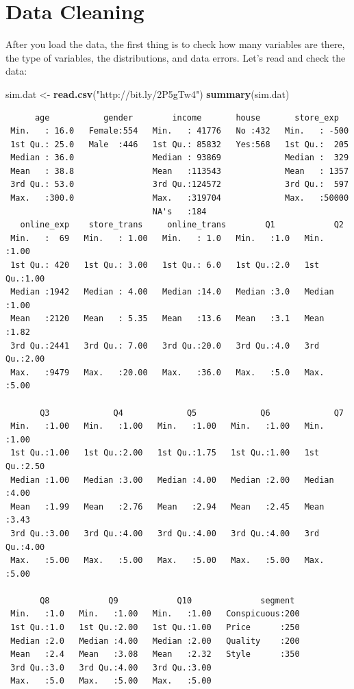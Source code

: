 \documentclass[12pt,]{krantz}
\makeatletter
\newenvironment{Shaded}{\begin{snugshade}}{\end{snugshade}}
\newcommand{\KeywordTok}[1]{\textcolor[rgb]{0.27,0.27,0.27}{\textbf{#1}}}
\newcommand{\NormalTok}[1]{#1}
\newcommand{\StringTok}[1]{\textcolor[rgb]{0.5,0.5,0.5}{#1}}
\newenvironment{kframe}{%
\medskip{}
\setlength{\fboxsep}{.8em}
 \def\at@end@of@kframe{}%
 \ifinner\ifhmode%
  \def\at@end@of@kframe{\end{minipage}}%
  \begin{minipage}{\columnwidth}%
 \fi\fi%
 \def\FrameCommand##1{\hskip\@totalleftmargin \hskip-\fboxsep
 \colorbox{shadecolor}{##1}\hskip-\fboxsep
     \hskip-\linewidth \hskip-\@totalleftmargin \hskip\columnwidth}%
 \MakeFramed {\advance\hsize-\width
   \@totalleftmargin\z@ \linewidth\hsize
   \@setminipage}}%
 {\par\unskip\endMakeFramed%
 \at@end@of@kframe}
\renewenvironment{Shaded}{\begin{kframe}}{\end{kframe}}
\makeatother
\begin{document}
\hypertarget{data-cleaning}{%
\section{Data Cleaning}\label{data-cleaning}}

After you load the data, the first thing is to check how many variables are there, the type of variables, the distributions, and data errors. Let's read and check the data:

\begin{Shaded}
\begin{Highlighting}[]
\NormalTok{sim.dat <-}\StringTok{ }\KeywordTok{read.csv}\NormalTok{(}\StringTok{"http://bit.ly/2P5gTw4"}\NormalTok{)}
\KeywordTok{summary}\NormalTok{(sim.dat)}
\end{Highlighting}
\end{Shaded}

\begin{verbatim}
      age           gender        income       house       store_exp    
 Min.   : 16.0   Female:554   Min.   : 41776   No :432   Min.   : -500  
 1st Qu.: 25.0   Male  :446   1st Qu.: 85832   Yes:568   1st Qu.:  205  
 Median : 36.0                Median : 93869             Median :  329  
 Mean   : 38.8                Mean   :113543             Mean   : 1357  
 3rd Qu.: 53.0                3rd Qu.:124572             3rd Qu.:  597  
 Max.   :300.0                Max.   :319704             Max.   :50000  
                              NA's   :184                               
   online_exp    store_trans     online_trans        Q1            Q2      
 Min.   :  69   Min.   : 1.00   Min.   : 1.0   Min.   :1.0   Min.   :1.00  
 1st Qu.: 420   1st Qu.: 3.00   1st Qu.: 6.0   1st Qu.:2.0   1st Qu.:1.00  
 Median :1942   Median : 4.00   Median :14.0   Median :3.0   Median :1.00  
 Mean   :2120   Mean   : 5.35   Mean   :13.6   Mean   :3.1   Mean   :1.82  
 3rd Qu.:2441   3rd Qu.: 7.00   3rd Qu.:20.0   3rd Qu.:4.0   3rd Qu.:2.00  
 Max.   :9479   Max.   :20.00   Max.   :36.0   Max.   :5.0   Max.   :5.00  
                                                                           
       Q3             Q4             Q5             Q6             Q7      
 Min.   :1.00   Min.   :1.00   Min.   :1.00   Min.   :1.00   Min.   :1.00  
 1st Qu.:1.00   1st Qu.:2.00   1st Qu.:1.75   1st Qu.:1.00   1st Qu.:2.50  
 Median :1.00   Median :3.00   Median :4.00   Median :2.00   Median :4.00  
 Mean   :1.99   Mean   :2.76   Mean   :2.94   Mean   :2.45   Mean   :3.43  
 3rd Qu.:3.00   3rd Qu.:4.00   3rd Qu.:4.00   3rd Qu.:4.00   3rd Qu.:4.00  
 Max.   :5.00   Max.   :5.00   Max.   :5.00   Max.   :5.00   Max.   :5.00  
                                                                           
       Q8            Q9            Q10              segment   
 Min.   :1.0   Min.   :1.00   Min.   :1.00   Conspicuous:200  
 1st Qu.:1.0   1st Qu.:2.00   1st Qu.:1.00   Price      :250  
 Median :2.0   Median :4.00   Median :2.00   Quality    :200  
 Mean   :2.4   Mean   :3.08   Mean   :2.32   Style      :350  
 3rd Qu.:3.0   3rd Qu.:4.00   3rd Qu.:3.00                    
 Max.   :5.0   Max.   :5.00   Max.   :5.00                    
\end{verbatim}
\end{document}
